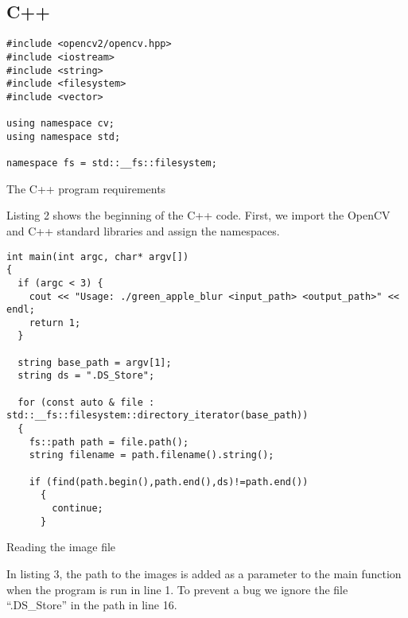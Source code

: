 \subsection{C++}

\begin{listing}[!ht]
\begin{verbatim}
#include <opencv2/opencv.hpp>
#include <iostream>
#include <string>
#include <filesystem>
#include <vector>

using namespace cv;
using namespace std;

namespace fs = std::__fs::filesystem;
\end{verbatim}
\caption{The C++ program requirements}
\label{listing:c++requirements}
\end{listing}

Listing 2 shows the beginning of the C++ code. First, we import the OpenCV and C++ standard libraries and assign the namespaces.

\begin{listing}[ht]
\begin{verbatim}
int main(int argc, char* argv[])
{
  if (argc < 3) {
    cout << "Usage: ./green_apple_blur <input_path> <output_path>" << endl;
    return 1;
  }

  string base_path = argv[1];
  string ds = ".DS_Store";

  for (const auto & file : std::__fs::filesystem::directory_iterator(base_path))
  {
    fs::path path = file.path();
    string filename = path.filename().string();

    if (find(path.begin(),path.end(),ds)!=path.end())
      {
        continue;
      }

\end{verbatim}
\caption{Reading the image file}
\label{listing:c++-read}
\end{listing}

In listing 3, the path to the images is added as a parameter to the main function when the program is run in line 1. To prevent a bug we ignore the file “.DS\_Store” in the path in line 16.

